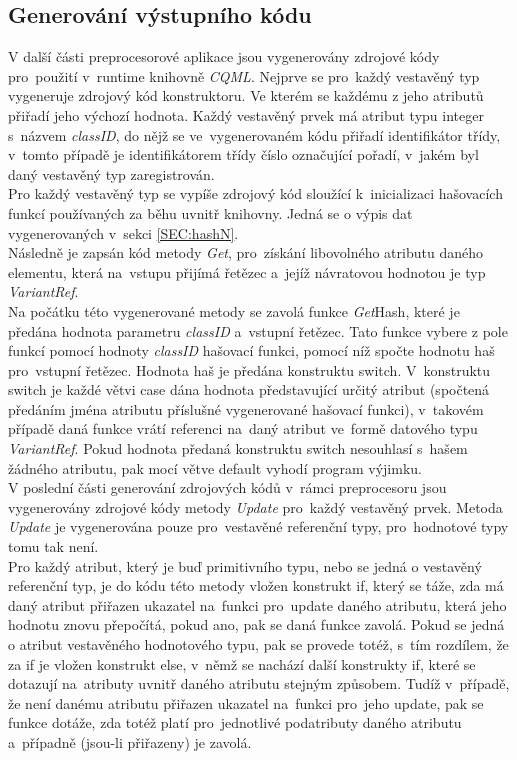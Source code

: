 \documentclass[11pt,twoside,a4paper]{book}
\begin{document}
\subsection{Generování výstupního kódu}
V další části preprocesorové aplikace jsou vygenerovány zdrojové kódy pro~použití v~runtime knihovně \textit{CQML}.
Nejprve se pro~každý vestavěný typ vygeneruje zdrojový kód konstruktoru. Ve kterém se každému z jeho atributů přiřadí jeho výchozí hodnota. Každý vestavěný prvek má atribut typu integer s~názvem \textit{classID}, do nějž se ve~vygenerovaném kódu přiřadí identifikátor třídy, v~tomto případě je identifikátorem třídy číslo označující pořadí, v~jakém byl daný vestavěný typ zaregistrován.\\
Pro každý vestavěný typ se vypíše zdrojový kód sloužící k~inicializaci hašovacích funkcí používaných za běhu uvnitř knihovny. Jedná se o výpis dat vygenerovaných v~sekci \ref{SEC:hashN}.\\
Následně je zapsán kód metody \textit{Get}, pro~získání libovolného atributu daného elementu, která na~vstupu přijímá řetězec a~jejíž návratovou hodnotou je typ \textit{VariantRef}.\\
Na počátku této vygenerované metody se zavolá funkce \textit{Get}Hash, které je předána hodnota parametru \textit{classID} a~vstupní řetězec. Tato funkce vybere z pole funkcí pomocí hodnoty \textit{classID} hašovací funkci, pomocí níž spočte hodnotu haš pro~vstupní řetězec. Hodnota haš je předána konstruktu switch. V~konstruktu switch je každé větvi case dána hodnota představující určitý atribut (spočtená předáním jména atributu příslušné vygenerované hašovací funkci), v~takovém případě daná funkce vrátí referenci na~daný atribut ve~formě datového typu \textit{VariantRef}. Pokud hodnota předaná konstruktu switch nesouhlasí s~hašem žádného atributu, pak mocí větve default vyhodí program výjimku.\\
V poslední části generování zdrojových kódů v~rámci preprocesoru jsou vygenerovány zdrojové kódy metody \textit{Update} pro~každý vestavěný prvek. Metoda \textit{Update} je vygenerována pouze pro~vestavěné referenční typy, pro~hodnotové typy tomu tak není. \\
Pro každý atribut, který je buď primitivního typu, nebo se jedná o vestavěný referenční typ, je do kódu této metody vložen konstrukt if, který se táže, zda má daný atribut přiřazen ukazatel na~funkci pro~update daného atributu, která jeho hodnotu znovu přepočítá, pokud ano, pak se daná funkce zavolá.
Pokud se jedná o atribut vestavěného hodnotového typu, pak se provede totéž, s~tím rozdílem, že za if je vložen konstrukt else, v~němž se nachází další konstrukty if, které se dotazují na~atributy uvnitř daného atributu stejným způsobem. Tudíž v~případě, že není danému atributu přiřazen ukazatel na~funkci pro~jeho update, pak se funkce dotáže, zda totéž platí pro~jednotlivé podatributy daného atributu a~případně (jsou-li přiřazeny) je zavolá.\\
\end{document}
